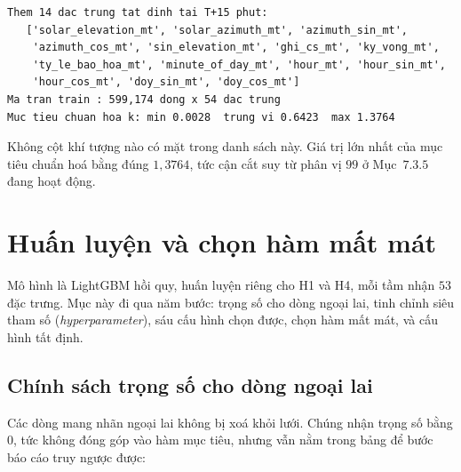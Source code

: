 \documentclass[12pt, a4paper]{report}
\begin{document}
\begingroup
\par{}\vspace{8pt}
\small\renewcommand{\baselinestretch}{1.0}\selectfont
\begin{verbatim}
Them 14 dac trung tat dinh tai T+15 phut:
   ['solar_elevation_mt', 'solar_azimuth_mt', 'azimuth_sin_mt',
    'azimuth_cos_mt', 'sin_elevation_mt', 'ghi_cs_mt', 'ky_vong_mt',
    'ty_le_bao_hoa_mt', 'minute_of_day_mt', 'hour_mt', 'hour_sin_mt',
    'hour_cos_mt', 'doy_sin_mt', 'doy_cos_mt']
Ma tran train : 599,174 dong x 54 dac trung
Muc tieu chuan hoa k: min 0.0028  trung vi 0.6423  max 1.3764
\end{verbatim}
\par\vspace{8pt}
\endgroup
Không cột khí tượng nào có mặt trong danh sách này. Giá trị lớn nhất của mục tiêu chuẩn hoá
bằng đúng $1{,}3764$, tức cận cắt suy từ phân vị $99$ ở Mục~$7.3.5$ đang hoạt động.

\FloatBarrier
\section{Huấn luyện và chọn hàm mất mát}

Mô hình là LightGBM hồi quy, huấn luyện riêng cho H1 và H4, mỗi tầm nhận $53$ đặc trưng.
Mục này đi qua năm bước: trọng số cho dòng ngoại lai, tinh chỉnh siêu tham số
(\textit{hyperparameter}), sáu cấu hình chọn được, chọn hàm mất mát, và cấu hình tất định.

\FloatBarrier
\subsection{Chính sách trọng số cho dòng ngoại lai}

Các dòng mang nhãn ngoại lai không bị xoá khỏi lưới. Chúng nhận trọng số bằng $0$, tức không
đóng góp vào hàm mục tiêu, nhưng vẫn nằm trong bảng để bước báo cáo truy ngược được:
\end{document}
